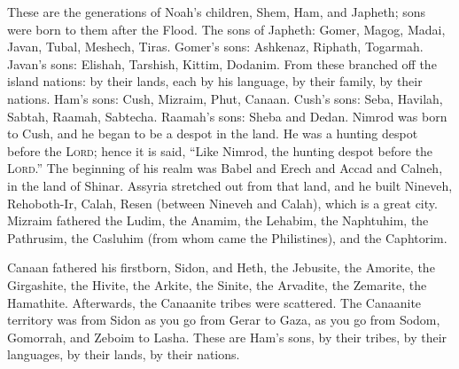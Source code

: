 
\begin{inparaenum}
     These are the generations of Noah's children, Shem, Ham, and Japheth; sons were born to them after the Flood.%
     The sons of Japheth: Gomer, Magog, Madai, Javan, Tubal, Meshech, Tiras.%
     Gomer's sons: Ashkenaz, Riphath, Togarmah.%
     Javan's sons: Elishah, Tarshish, Kittim, Dodanim.%
     From these branched off the island nations: by their lands, each by his language, by their family, by their nations.%
     Ham's sons: Cush, Mizraim, Phut, Canaan.%
     Cush's sons: Seba, Havilah, Sabtah, Raamah, Sabtecha. Raamah's sons: Sheba and Dedan.%
     Nimrod was born to Cush, and he began to be a despot in the land.%
     He was a hunting despot before the \textsc{Lord}; hence it is said, ``Like Nimrod, the hunting despot before the \textsc{Lord}.''%
     The beginning of his realm was Babel and Erech and Accad and Calneh, in the land of Shinar.%
     Assyria stretched out from that land, and he built Nineveh, Rehoboth-Ir, Calah,%
     Resen (between Nineveh and Calah), which is a great city.%
     Mizraim fathered the Ludim, the Anamim, the Lehabim, the Naphtuhim,%
     the Pathrusim, the Casluhim (from whom came the Philistines), and the Caphtorim.%
    
     Canaan fathered his firstborn, Sidon, and Heth,%
     the Jebusite, the Amorite, the Girgashite,%
     the Hivite, the Arkite, the Sinite,%
     the Arvadite, the Zemarite, the Hamathite. Afterwards, the Canaanite tribes were scattered.%
     The Canaanite territory was from Sidon as you go from Gerar to Gaza, as you go from Sodom, Gomorrah, and Zeboim to Lasha.%
     These are Ham's sons, by their tribes, by their languages, by their lands, by their nations.%
    

\end{inparaenum}

